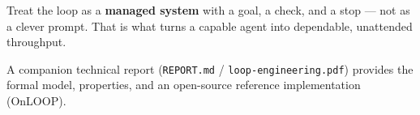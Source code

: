 \documentclass[11pt]{article}
\begin{document}
\begin{tcolorbox}[colback=mckblue!8,colframe=mckblue,coltitle=white,
  fonttitle=\bfseries,title=The one thing to remember,sharp corners,boxrule=1pt]
Treat the loop as a \textbf{managed system} with a goal, a check, and a stop ---
not as a clever prompt. That is what turns a capable agent into dependable,
unattended throughput.
\end{tcolorbox}

\vspace{4pt}
{\footnotesize\color{mckgray} A companion technical report (\texttt{REPORT.md} /
\texttt{loop-engineering.pdf}) provides the formal model, properties, and an
open-source reference implementation (OnLOOP).}
\end{document}
